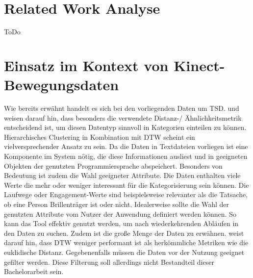 \section{Related Work Analyse}
\label{chapter2-RelatedWork}
ToDo


\section{Einsatz im Kontext von Kinect-Bewegungsdaten}
\label{chapter2-Einsatz}
Wie bereits erwähnt handelt es sich bei den vorliegenden Daten um \ac{TSD}.
\citet{warren_liao_clustering_2005} und \citet{aghabozorgi_time-series_2015} weisen darauf hin,
dass besonders die verwendete Distanz-/ Ähnlichkeitsmetrik entscheidend ist,
um diesen Datentyp sinnvoll in Kategorien einteilen zu können.
Hierarchisches Clustering in Kombination mit \ac{DTW} scheint ein vielversprechender Ansatz zu sein.
Da die Daten in Textdateien vorliegen ist eine Komponente im System nötig,
die diese Informationen ausliest und in geeigneten Objekten der genutzten Programmiersprache abspeichert.
Besonders von Bedeutung ist zudem die Wahl geeigneter Attribute.
Die Daten enthalten viele Werte die mehr oder weniger interessant für die Kategorisierung sein können.
Die Laufwege oder Engagement-Werte sind beispielsweise relevanter als die Tatsache,
ob eine Person Brillenträger ist oder nicht.
Idealerweise sollte die Wahl der genutzten Attribute vom Nutzer der Anwendung definiert werden können.
So kann das Tool effektiv genutzt werden, um nach wiederkehrenden Abläufen in den Daten zu suchen.
Zudem ist die große Menge der Daten zu erwähnen.
\citet{aghabozorgi_time-series_2015} weist darauf hin,
dass \ac{DTW} weniger performant ist als herkömmliche Metriken wie die euklidische Distanz.
Gegebenenfalls müssen die Daten vor der Nutzung geeignet gefilter werden.
Diese Filterung soll allerdings nicht Bestandteil dieser Bachelorarbeit sein.